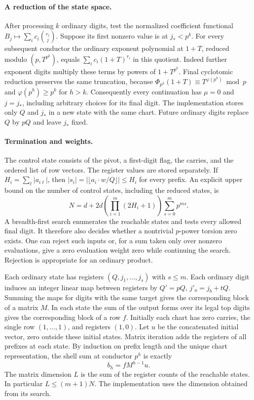 \paragraph{A reduction of the state space.}
After processing $k$ ordinary digits, test the normalized coefficient
functional $B_j\mapsto\sum_i c_i\binom{r_i}{j}$. Suppose its first
nonzero value is at $j_*<p^k$. For every subsequent conductor the
ordinary exponent polynomial at $1+T$, reduced modulo $(p,T^{p^k})$,
equals $\sum_i c_i(1+T)^{r_i}$ in this quotient.
Indeed further exponent digits multiply these terms by powers of
$1+T^{p^k}$. Final cyclotomic reduction preserves the same truncation,
because $\Phi_{p^h}(1+T)\equiv T^{\varphi(p^h)}\bmod p$ and
$\varphi(p^h)\ge p^k$ for $h>k$. Consequently every continuation has
$\mu=0$ and $j=j_*$, including arbitrary choices for its final digit.
The implementation stores only $Q$ and $j_*$ in a new state with the
same chart. Future ordinary digits replace $Q$ by $pQ$ and leave
$j_*$ fixed.

\paragraph{Termination and weights.}
The control state consists of the pivot, a first-digit flag, the
carries, and the ordered list of row vectors. The register values are
stored separately. If $H_i=\sum_\ell |a_{i\ell}|$, then
$|s_i|=|\lfloor a_i\cdot w/Q\rfloor|\le H_i$ for every prefix.
An explicit upper bound on the number of control states, including the
reduced states, is
\[
 N=d+2d\left(\prod_{i=1}^m(2H_i+1)\right)\sum_{s=0}^m p^{ms}.
\]
A breadth-first search enumerates the reachable states and tests every
allowed final digit. It therefore also decides whether a nontrivial
$p$-power torsion zero exists. One can reject such inputs or, for a
sum taken only over nonzero evaluations, give a zero evaluation
weight zero while continuing the search. Rejection is appropriate
for an ordinary product.

Each ordinary state has registers $(Q,j_1,\ldots,j_s)$ with $s\le m$.
Each ordinary digit induces an integer linear map between registers by
$Q'=pQ$, $j'_a=j_b+tQ$. Summing the maps for digits with the same target
gives the corresponding block of a matrix $M$. In each state the sum
of the output forms over its legal top digits gives the corresponding
block of a row $f$. Initially each chart has zero carries, the single
row $(1,\ldots,1)$, and registers $(1,0)$. Let $u$ be the concatenated
initial vector, zero outside these initial states. Matrix iteration
adds the registers of all prefixes at each state. By induction on
prefix length and the unique chart representation, the shell sum at
conductor $p^h$ is exactly
\[
 b_h=fM^{h-1}u .
\]
The matrix dimension $L$ is the sum of the register counts of the
reachable states. In particular $L\le(m+1)N$. The implementation
uses the dimension obtained from its search.

